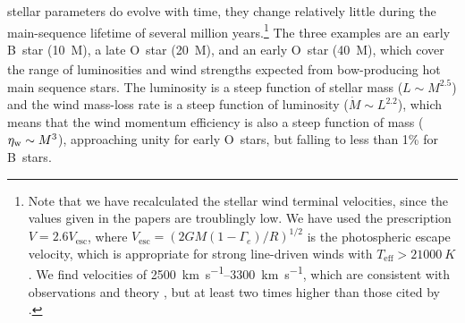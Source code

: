 stellar parameters do evolve with time, they change relatively little
during the main-sequence lifetime of several million years.\footnote{%
  \label{fn:meyer-velocities-too-low}
  Note that we have recalculated the stellar wind terminal velocities,
  since the values given in the \citeauthor{Meyer:2014b} papers are
  troublingly low.  We have used the prescription
  \(V = 2.6 V_{\text{esc}}\), where
  \(V_{\text{esc}} = \left( 2 G M (1 - \Gamma_e)/ R \right)^{1/2}\) is the
  photospheric escape velocity, which is appropriate for strong
  line-driven winds with \(T_{\text{eff}} > \SI{21 000}{K}\)
  \citep{Lamers:1995a}.  We find velocities of
  \SIrange{2500}{3300}{km.s^{-1}}, which are consistent with
  observations and theory \citep{Vink:2000a}, but at least two times
  higher than those cited by \citet{Meyer:2014b}. } %
The three examples are an early B~star (\SI{10}{M_\odot}), a late O~star
(\SI{20}{M_\odot}), and an early O~star (\SI{40}{M_\odot}), which cover the
range of luminosities and wind strengths expected from bow-producing
hot main sequence stars.  The luminosity is a steep function of
stellar mass (\(L \sim M^{2.5}\)) and the wind mass-loss rate is a steep
function of luminosity (\(\dot{M} \sim L^{2.2}\)), which means that the
wind momentum efficiency is also a steep function of mass
(\(\eta_{\text{w}} \sim M^3\)), approaching unity for early O~stars, but falling
to less than 1\% for B~stars.

